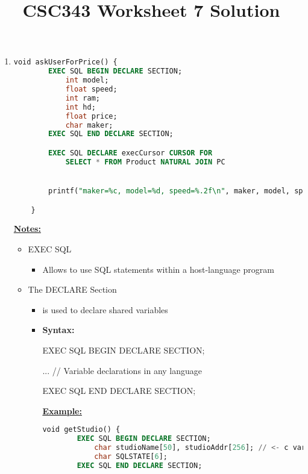 \documentclass[12pt]{article}
\begin{document}
\title{CSC343 Worksheet 7 Solution}
\maketitle

\bigskip

\begin{enumerate}[1.]
    \item

    \begin{lstlisting}[language=SQL]
    void askUserForPrice() {
        EXEC SQL BEGIN DECLARE SECTION;
            int model;
            float speed;
            int ram;
            int hd;
            float price;
            char maker;
        EXEC SQL END DECLARE SECTION;

        EXEC SQL DECLARE execCursor CURSOR FOR
            SELECT * FROM Product NATURAL JOIN PC


        printf("maker=%c, model=%d, speed=%.2f\n", maker, model, speed);

    }
    \end{lstlisting}

    \bigskip

    \underline{\textbf{Notes:}}

    \bigskip

    \begin{itemize}
        \item EXEC SQL
        \begin{itemize}
            \item Allows to use SQL statements within a host-language program
        \end{itemize}
        \item The DECLARE Section
        \begin{itemize}
            \item is used to declare shared variables
            \item \textbf{Syntax:}

            EXEC SQL BEGIN DECLARE SECTION;

            ... // Variable declarations in any language

            EXEC SQL END DECLARE SECTION;

            \bigskip

            \underline{\textbf{Example:}}

            \bigskip

    \begin{lstlisting}[language=SQL]
    void getStudio() {
        EXEC SQL BEGIN DECLARE SECTION;
            char studioName[50], studioAddr[256]; // <- c variables
            char SQLSTATE[6];
        EXEC SQL END DECLARE SECTION;


\end{lstlisting}
\end{itemize}
\end{itemize}
\end{enumerate}
\end{document}
